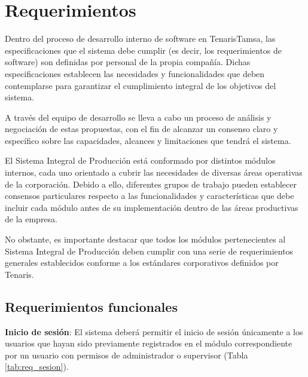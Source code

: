 \section{Requerimientos}

Dentro del proceso de desarrollo interno de software en TenarisTamsa, las especificaciones que el sistema debe cumplir (es decir, los requerimientos de software) son definidas por personal de la propia compañía. Dichas especificaciones establecen las necesidades y funcionalidades que deben contemplarse para garantizar el cumplimiento integral de los objetivos del sistema.

A través del equipo de desarrollo se lleva a cabo un proceso de análisis y negociación de estas propuestas, con el fin de alcanzar un consenso claro y específico sobre las capacidades, alcances y limitaciones que tendrá el sistema.

El Sistema Integral de Producción está conformado por distintos módulos internos, cada uno orientado a cubrir las necesidades de diversas áreas operativas de la corporación. Debido a ello, diferentes grupos de trabajo pueden establecer consensos particulares respecto a las funcionalidades y características que debe incluir cada módulo antes de su implementación dentro de las áreas productivas de la empresa.

No obstante, es importante destacar que todos los módulos pertenecientes al Sistema Integral de Producción deben cumplir con una serie de requerimientos generales establecidos conforme a los estándares corporativos definidos por Tenaris.



\subsection{Requerimientos funcionales}

\textbf{Inicio de sesión}: El sistema deberá permitir el inicio de sesión únicamente a los usuarios que hayan sido previamente registrados en el módulo correspondiente por un usuario con permisos de administrador o supervisor (Tabla \ref{tab:req_sesion}).

